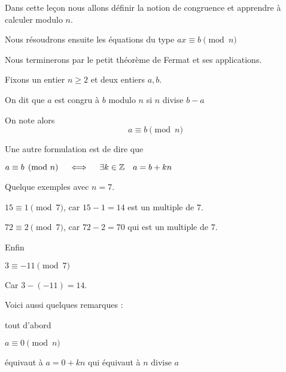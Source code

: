 





\debuttexte


\diapo

\change

\change

Dans cette leçon nous allons définir la notion de congruence
et apprendre à calculer modulo $n$.

\change

Nous résoudrons ensuite les équations du type $ax \equiv b \pmod n$

\change

Nous terminerons par le petit théorème de Fermat et ses applications.


\diapo



Fixons un entier $n\ge 2$ et deux entiers $a,b$.


On dit que $a$ est congru à $b$ modulo $n$ si $n$ divise $b-a$

\change

On note alors 
$$a \equiv b \pmod n$$ 

\change

Une autre formulation est de dire que 

$a \equiv b \pmod n \quad \iff \quad \exists k \in \mathbb{Z} \quad a = b +kn$

\change
Quelque exemples avec $n=7$.

$15 \equiv 1 \pmod 7$, car $15 -1 = 14$ est un multiple de $7$. 

\change

$72 \equiv 2 \pmod {7}$, car $72-2 = 70$ qui est un multiple de $7$.


\change

Enfin

$3 \equiv -11 \pmod{7}$

Car $3 - (-11) = 14$.

\change

Voici aussi quelques remarques :

tout d'abord 

$a\equiv 0 \pmod n$

équivaut à $a=0+kn$ qui équivaut à $n \text{ divise } a$

